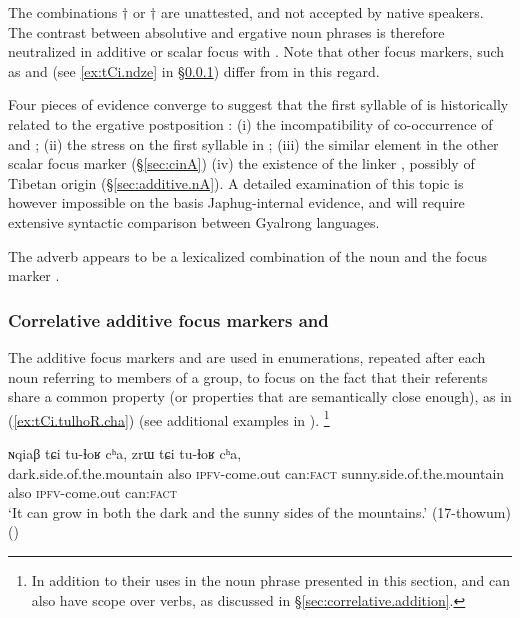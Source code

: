 The combinations $\dagger$ or $\dagger$ are unattested, and not accepted by native speakers. The contrast between absolutive and ergative noun phrases is therefore neutralized in additive or scalar focus with . Note that other focus markers, such as  and  (see \ref{ex:tCi.ndze} in §\ref{sec:ri.additive}) differ from  in this regard.

Four pieces of evidence converge to suggest that the first syllable of  is historically related to the ergative postposition : (i) the incompatibility of co-occurrence of  and ; (ii) the stress on the first syllable in ; (iii) the similar  element in the other scalar focus marker  (§\ref{sec:cinA}) (iv) the existence of the linker , possibly of Tibetan origin (§\ref{sec:additive.nA}). A detailed examination of this topic is however impossible on the basis Japhug-internal evidence, and will require extensive syntactic comparison between Gyalrong languages.

The adverb  appears to be a lexicalized combination of the noun  and the focus marker .

 \subsubsection{Correlative additive focus markers  and } \label{sec:ri.additive} 
 The additive focus markers  and   are used in enumerations, repeated after each noun referring to  members of a group, to focus on the fact that their referents share a common property (or properties that are semantically close enough), as in (\ref{ex:tCi.tulhoR.cha}) (see additional examples in \citealt[313--314]{jacques14linking}). \footnote{In addition to their uses in the noun phrase presented in this section,     and    can also have scope over verbs, as discussed in §\ref{sec:correlative.addition}. } 
  
 \begin{exe}
\ex \label{ex:tCi.tulhoR.cha}
 \gll  ɴqiaβ tɕi tu-ɬoʁ cʰa, zrɯ tɕi tu-ɬoʁ cʰa, \\
 dark.side.of.the.mountain also \textsc{ipfv}-come.out can:\textsc{fact}   sunny.side.of.the.mountain also \textsc{ipfv}-come.out can:\textsc{fact}  \\
 \glt `It can grow in both the dark and the sunny sides of the mountains.' (17-thowum)
()
\end{exe}
  

